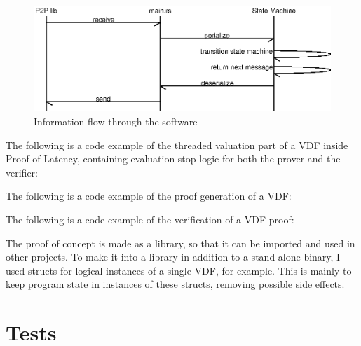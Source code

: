 \begin{figure}
	\includegraphics[width=\textwidth]{pictures/message_flow.eps}
	\caption{Information flow through the software}
	\label{message_flow}
\end{figure}

The following is a code example of the threaded valuation part of a VDF inside Proof of Latency, containing evaluation stop logic for both the prover and the verifier:


The following is a code example of the proof generation of a VDF:

The following is a code example of the verification of a VDF proof:

The proof of concept is made as a library, so that it can be imported and used in other projects. To make it into a library in addition to a stand-alone binary, I used structs for logical instances of a single VDF, for example. This is mainly to keep program state in instances of these structs, removing possible side effects.


\section{Tests}
